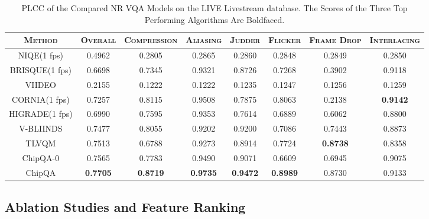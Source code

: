 \documentclass[journal]{IEEEtran}
\begin{document}
\begin{table*}[!h]
\renewcommand\arraystretch{1.3}
\centering
\caption{PLCC of the Compared NR VQA Models on the LIVE Livestream database. The Scores of the Three Top Performing Algorithms Are Boldfaced.}\label{tab:plccall}
\begin{tabular}{|c|c|c|c|c|c|c|c|}
\hline
\textsc{Method} & \textsc{Overall} & \textsc{Compression} & \textsc{Aliasing} & \textsc{Judder} & \textsc{Flicker} & \textsc{Frame Drop} & \textsc{Interlacing}\\
\hline
NIQE(1 fps)& 0.4962 &0.2805 & 0.2865 & 0.2860  & 0.2848  & 0.2849  & 0.2850  \\
\hline
BRISQUE(1 fps)&0.6698& 0.7345  & 0.9321  & 0.8726  & 0.7268  & 0.3902   & {0.9118}  \\
\hline
VIIDEO & 0.2155 & 0.1222  & 0.1222  & 0.1235  & 0.1247  & 0.1256  & 0.1259  \\
\hline
CORNIA(1 fps)& 0.7257 & 0.8115  & {0.9508 } & 0.7875  &{ 0.8063 } &0.2138   & \textbf{{0.9142}}\\
\hline
HIGRADE(1 fps)&0.6990 &0.7595   & {0.9353}  & 0.7614  &0.6889   & 0.6062   & 0.8800   \\
\hline
V-BLIINDS& 0.7477 & {0.8055}  & 0.9202  &  {0.9200 }& 0.7086  & 0.7443   &  0.8873 \\
\hline
{TLVQM} & {0.7513} & 0.6788  & 0.9273   & {0.8914}  & {0.7724}  & \textbf{{0.8738}}  & 0.8358   \\
\hline
{ChipQA-0} & {0.7565} & {0.7783}  & {0.9490}   & 0.9071  & 0.6609  &{0.6945} & {0.9075}   \\
\hline
{ChipQA} &\textbf{0.7705} & \textbf{0.8719}  & \textbf{0.9735}   & \textbf{{0.9472}}  & \textbf{{0.8989}}  & {0.8730} & 0.9133   \\
\hline
\end{tabular}
\end{table*}




\subsection{Ablation Studies and Feature Ranking}
\end{document}
